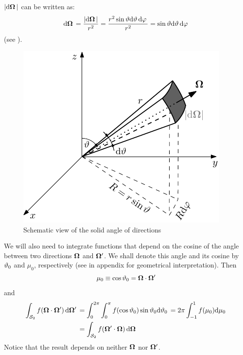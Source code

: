 $\abs{\d{\bomega}}$ can be written as:
$$
	\d{\bomega} = \frac{\abs{\d{\bomega}}}{r^2} = \frac{r^2 \sint \d{\polar}\d{\azimuthal}}{r^2} =  \sint
	\d{\polar}\d{\azimuthal} $$
(see ).
\begin{figure}[!hbt]
    \centering
    \includegraphics[scale=1.275]{element}
    \caption[Solid angle]{Schematic view of the solid angle of directions}
    \label{fig:element}
\end{figure}
We will also need to integrate functions that depend on the cosine of the angle between two 
directions $\bomega$ and $\bomega'$. We shall denote this angle and its cosine by $\polar_0$ and $\mu_0$, respectively
(see  in appendix for geometrical interpretation).
Then
$$
	\mu_0 \equiv \cos \polar_0 = \bomega\cdot\bomega'
$$
and
\begin{equation}\label{eq:invint}
\begin{aligned}
	\intA[']{f(\bomega\cdot\bomega')} &= \int_{0}^{2\pi} \int_{0}^{\pi}
		f(\cos \polar_0) \sin \polar_0\d{\polar_0} = 2\pi \muint[_0]{f(\mu_0)}\\
		&= \intA{f(\bomega'\cdot\bomega)}
\end{aligned}
\end{equation}
Notice that the result depends on neither $\bomega$ nor $\bomega'$.

